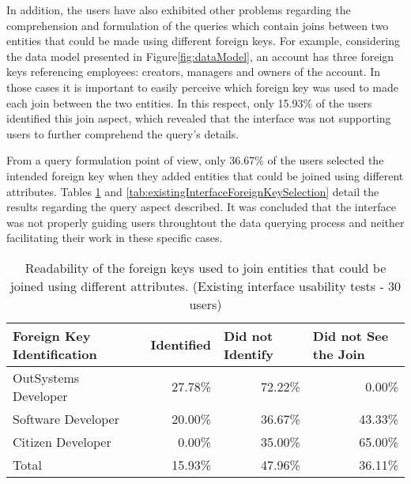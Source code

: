 In addition, the users have also exhibited other problems regarding the comprehension and formulation of the queries which contain joins between two entities that could be made using different foreign keys. For example, considering the data model presented in  Figure\ref{fig:dataModel}, an account has three foreign keys referencing employees: creators, managers and owners of the account. In those cases it is important to easily perceive which foreign key was used to made each join between the two entities. In this respect, only 15.93\% of the users identified this join aspect, which revealed that the interface was not supporting users to further comprehend the query's details. 

From a query formulation point of view, only 36.67\% of the users selected the intended foreign key when they added entities that could be joined using different attributes. Tables \ref{tab:existingInterfaceForeignKeyIdentification} and \ref{tab:existingInterfaceForeignKeySelection} detail the results regarding the query aspect described. It was concluded that the interface was not properly guiding users throughtout the data querying process and neither facilitating their work in these specific cases.

\begin{table}[tb]
    \caption{Readability of the foreign keys used to join entities that could be joined using different attributes. (Existing interface usability tests - 30 users)}
    \label{tab:existingInterfaceForeignKeyIdentification}
    \begin{tabular}{@{}lrrr@{}}
    \toprule
    \textbf{Foreign Key Identification} & \multicolumn{1}{l}{Identified} & \multicolumn{1}{l}{Did not Identify} & \multicolumn{1}{l}{Did not See the Join} \\ \midrule
    OutSystems Developer                & 27.78\%                        & 72.22\%                              & 0.00\%                                   \\
    Software Developer                  & 20.00\%                        & 36.67\%                              & 43.33\%                                  \\
    Citizen Developer                   & 0.00\%                         & 35.00\%                              & 65.00\%                                  \\
    Total                               & 15.93\%                        & 47.96\%                              & 36.11\%                                  \\ \bottomrule
    \end{tabular}
    \end{table}


